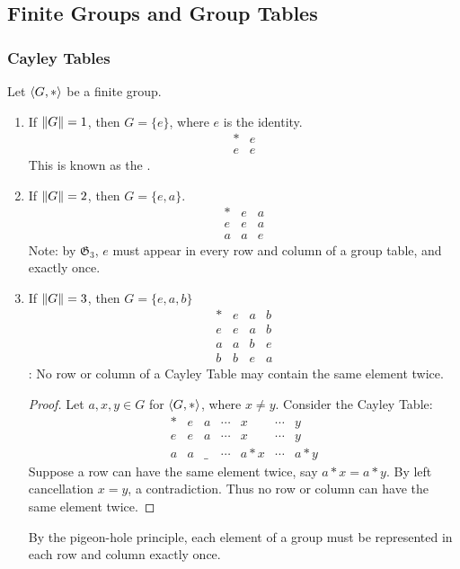 \subsection{Finite Groups and Group Tables}

\subsubsection*{Cayley Tables}
Let $\langle G,* \rangle$ be a finite group.
\begin{enumerate}
    \item If $\lVert G \rVert = 1$, then $G = \{e\}$, where $e$ is the identity.
    \[
        \begin{array}{c|c}
            * & e \\
            \hline
            e & e
        \end{array}
    \]
    This is known as the .
    \item If $\lVert G \rVert = 2$, then $G = \{e,a\}$.
    \[
        \begin{array}{c|cc}
            * & e & a \\
            \hline
            e & e & a \\
            a & a & e
        \end{array}
    \]
    Note: by $\mathfrak{G}_3$, $e$ must appear in every row and column of a group table, and exactly once.
    \item If $\lVert G \rVert = 3$, then $G = \{e,a,b\}$
    \[
        \begin{array}{c|ccc}
            * & e & a & b \\
            \hline
            e & e & a & b \\
            a & a & b & e \\
            b & b & e & a
        \end{array}
    \]
    : No row or column of a Cayley Table may contain the same element twice.
    \begin{proof}
        Let $a,x,y \in G$ for $\langle G,* \rangle$, where $x \neq y$. Consider the Cayley Table:
        \[
            \begin{array}{c|cccccc}
                * & e & a & \cdots & x & \cdots & y \\
                \hline
                e & e & a & \cdots & x & \cdots & y \\
                a & a & \_ & \cdots & a*x & \cdots & a*y
            \end{array}
        \]
        Suppose a row can have the same element twice, say $a*x = a*y$. By left cancellation $x=y$, a contradiction. Thus no row or column can have the same element twice.
    \end{proof}
    By the pigeon-hole principle, each element of a group must be represented in each row and column exactly once.
\end{enumerate}